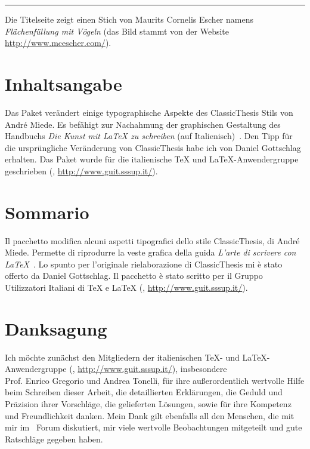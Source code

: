 \documentclass[10pt,a4paper,twoside,openright,titlepage,fleqn,%
               headinclude,,footinclude,BCOR5mm,%
               numbers=noenddot,cleardoublepage=empty,%
               tablecaptionabove]{scrreprt}
\DeclareRobustCommand*{\classicthesis}{ClassicThesis}
\DeclareRobustCommand*{\classicthesis}{Classic\-Thesis}
\begin{document}
\vspace{1cm}
\hrule
\bigskip

\noindent Die Titelseite zeigt einen Stich von Maurits Cornelis Escher
namens \emph{Flächenfüllung mit Vögeln} (das Bild stammt von der Website \url{http://www.mcescher.com/}).
\clearpage
%
\begingroup
\let\clearpage\relax
\let\cleardoublepage\relax
\let\cleardoublepage\relax

\chapter*{Inhaltsangabe}
Das Paket verändert einige typographische Aspekte des \classicthesis{} Stils von Andr\'e Miede. Es 
befähigt zur Nachahmung der graphischen Gestaltung des Handbuchs \emph{Die Kunst mit \LaTeX{} zu 
schreiben} (auf  Italienisch)~\citep{pantieri:art}. Den Tipp für die
ursprüngliche Veränderung von \classicthesis{} habe ich von Daniel Gottschlag erhalten. Das Paket
wurde für die italienische \TeX{} und \LaTeX{}-Anwendergruppe geschrieben 
(\GuIT, \url{http://www.guit.sssup.it/}). 

\vfill

\chapter*{Sommario}
Il pacchetto modifica alcuni aspetti tipografici dello stile \classicthesis, di Andr\'e Miede. 
Permette di riprodurre la veste grafica della guida \emph{L'arte di scrivere con 
\LaTeX}~\citep{pantieri:art}. Lo spunto per l'originale rielaborazione di \classicthesis{} mi 
\`e stato offerto da Daniel Gottschlag. Il pacchetto \`e stato scritto per il Gruppo Utilizzatori
Italiani di \TeX{} e \LaTeX{} (\GuIT, \url{http://www.guit.sssup.it/}).


\endgroup			

\vfill

%

\begingroup
\let\clearpage\relax
\let\cleardoublepage\relax
\let\cleardoublepage\relax

\chapter*{Danksagung}
Ich möchte zunächst den Mitgliedern der italienischen \TeX{}- und
\LaTeX{}-Anwendergruppe (\GuIT*, \url{http://www.guit.sssup.it/}),
insbesondere\\ Prof. Enrico Gregorio und Andrea Tonelli, für ihre außerordentlich wertvolle Hilfe beim 
Schreiben dieser Arbeit, die detaillierten Erklärungen, die Geduld und
Präzision ihrer Vorschläge, die gelieferten Lösungen, sowie für ihre Kompetenz und Freundlichkeit 
danken.
Mein Dank gilt ebenfalls all den Menschen, die mit mir im \GuIT*~Forum diskutiert, mir viele wertvolle 
Beobachtungen mitgeteilt und gute Ratschläge gegeben haben.
\end{document}
